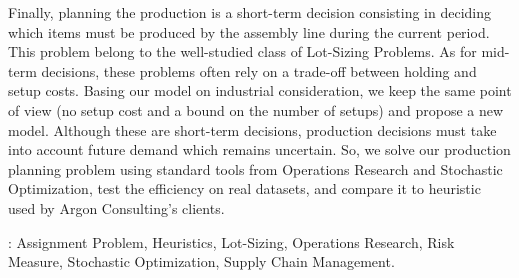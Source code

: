 Finally, planning the production is a short-term decision consisting in deciding which items must be produced by the assembly line during the current period.
This problem belong to the well-studied class of Lot-Sizing Problems.
As for mid-term decisions, these problems often rely on a trade-off between holding and setup costs.
Basing our model on industrial consideration, we keep the same point of view (no setup cost and a bound on the number of setups) and propose a new model.
Although these are short-term decisions, production decisions must take into account future demand which remains uncertain.
So, we solve our production planning problem using standard tools from Operations Research and Stochastic Optimization, test the efficiency on real datasets, and compare it to heuristic used by Argon Consulting's clients.


: Assignment Problem, Heuristics, Lot-Sizing, Operations Research, Risk Measure, Stochastic Optimization, Supply Chain Management.

